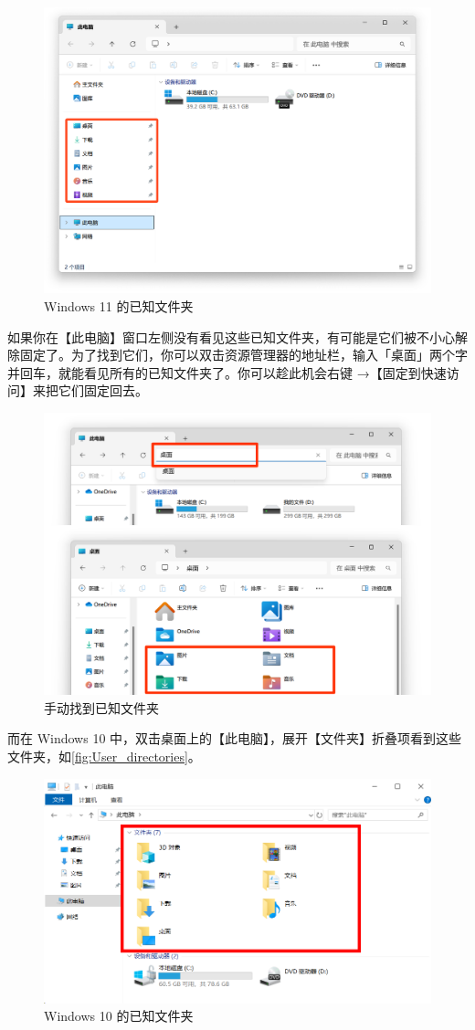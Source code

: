 {{{{\begin{figure}[htb!]
  \centering
  \includegraphics[width=.7\textwidth]{assets/basic/Win11_user_folders.png}
  \caption{Windows 11 的已知文件夹}
  \label{fig:Win11_user_folders}
\end{figure}

如果你在【此电脑】窗口左侧没有看见这些已知文件夹，有可能是它们被不小心解除固定了。为了找到它们，你可以双击资源管理器的地址栏，输入「桌面」两个字并回车，就能看见所有的已知文件夹了。你可以趁此机会右键 →【固定到快速访问】来把它们固定回去。

\begin{figure}[htb!]
  \centering
  \includegraphics[width=.7\textwidth]{assets/basic/Reach_known_folders_manually.png}
  \caption{手动找到已知文件夹}
  \label{fig:Reach_known_folders_manually}
\end{figure}

而在 Windows 10 中，双击桌面上的【此电脑】，展开【文件夹】折叠项看到这些文件夹，如\autoref{fig:User_directories}。

\begin{figure}[htb!]
  \centering
  \includegraphics[width=.7\textwidth]{assets/basic/User_directories.png}
  \caption{Windows 10 的已知文件夹}
  \label{fig:User_directories}
\end{figure}

}}}}
